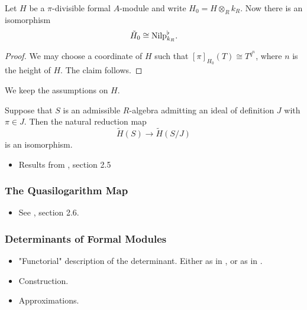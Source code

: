 \begin{lem}
  Let $H$ be a $\pi$-divisible formal $A$-module and write $H_0 = H \otimes_R k_R$. 
  Now there is an isomorphism 
  \begin{equation*}
    \tilde H_0 \cong {\mathrm{Nilp}}^\flat_{k_R}.
  \end{equation*}
\begin{proof}
  We may choose a coordinate of $H$ such that $[\pi]_{H_0}(T) \cong T^{q^n}$, where
  $n$ is the height of $H$. The claim follows.
\end{proof}
\end{lem}

We keep the assumptions on $H$.
\begin{lem}
  Suppose that $S$ is an admissible $R$-algebra admitting an ideal of definition
  $J$ with $\pi \in J$. Then the natural reduction map
  \begin{equation*}
    \tilde H(S) \to \tilde H(S/J)
  \end{equation*}
  is an isomorphism.
\end{lem}

\begin{itemize}
  \item Results from \cite{BoyarchenkoWeinstein2011MaxVar}, section 2.5
\end{itemize}



\subsubsection{The Quasilogarithm Map} %
\label{ssub:The Quasilogarithm map}
\begin{itemize}
  \item See \cite{BoyarchenkoWeinstein2011MaxVar}, section 2.6.
\end{itemize}

\subsubsection{Determinants of Formal Modules} %
\label{ssub:Determinants of Formal Modules}
\begin{itemize}
  \item "Functorial" description of the determinant. Either as in
    \cite{BoyarchenkoWeinstein2011MaxVar}, or as in \cite{weinstein2016semistable}.
  \item Construction.
  \item Approximations.
\end{itemize}


